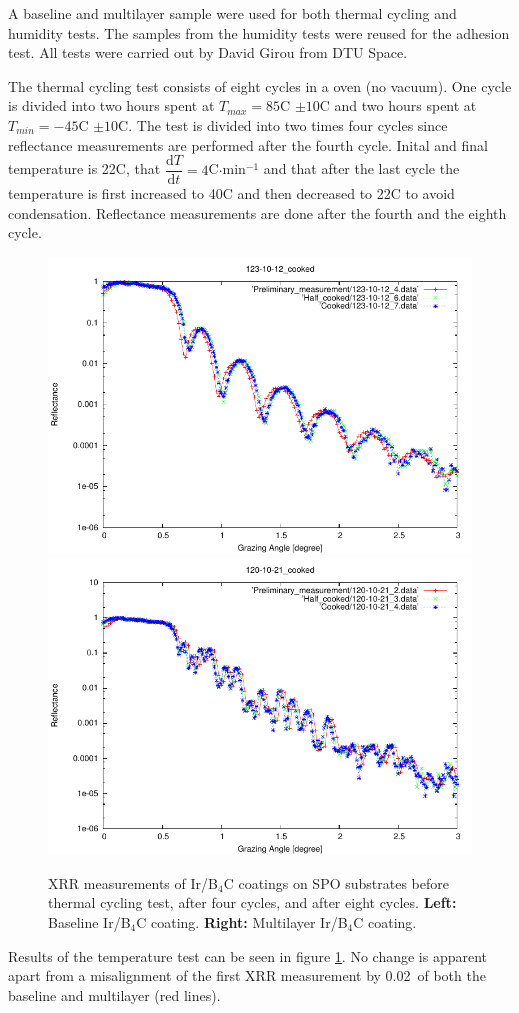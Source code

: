 A baseline and multilayer sample were used for both thermal cycling and humidity tests. The samples from the humidity tests were reused for the adhesion test. All tests were carried out by David Girou from DTU Space.

The thermal cycling test consists of eight cycles in a oven (no vacuum). One cycle is divided into two hours spent at $T_{max}=85$\degr C $\pm 10$\degr C and two hours spent at $T_{min}=-45$\degr C $\pm 10$\degr C. The test is divided into two times four cycles since reflectance measurements are performed after the fourth cycle. Inital and final temperature is 22\degr C, that $\dfrac{\text{d}T}{\text{d}t}=4$\degr C$\cdot$min$^{-1}$ and that after the last cycle the temperature is first increased to 40\degr C and then decreased to 22\degr C to avoid condensation. Reflectance measurements are done after the fourth and the eighth cycle.

\begin{figure}[!h]
  \center
  \includegraphics[width=0.47\linewidth]{figures/athena/coating_on_spo/123-10-12_cooked.pdf}
  \includegraphics[width=0.47\linewidth]{figures/athena/coating_on_spo/120-10-21_cooked.pdf}
\caption{\footnotesize XRR measurements of Ir/B$_4$C coatings on SPO substrates before thermal cycling test, after four cycles, and after eight cycles. \textbf{Left:} Baseline Ir/B$_4$C coating. \textbf{Right:} Multilayer Ir/B$_4$C coating.}\label{fig:qa_temp}
\end{figure}

Results of the temperature test can be seen in figure \ref{fig:qa_temp}. No change is apparent apart from a misalignment of the first XRR measurement by 0.02\degr\ of both the baseline and multilayer (red lines).

